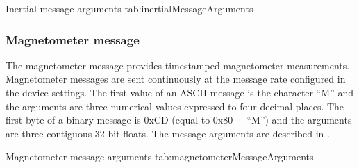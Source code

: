\begingroup
    \def\tempArgumentA{Gyroscope X axis in degrees per second}
    \def\tempArgumentB{Gyroscope Y axis in degrees per second}
    \def\tempArgumentC{Gyroscope Z axis in degrees per second}
    \def\tempArgumentD{Accelerometer X axis in g}
    \def\tempArgumentE{Accelerometer Y axis in g}
    \def\tempArgumentF{Accelerometer Z axis in g}
    \dataMessageTable
    {Inertial message arguments}
    {tab:inertialMessageArguments}
\endgroup

\begingroup
    \def\tempNameA{Gyroscope X axis}
    \def\tempNameB{Gyroscope Y axis}
    \def\tempNameC{Gyroscope Z axis}
    \def\tempNameD{Accelerometer X axis}
    \def\tempNameE{Accelerometer Y axis}
    \def\tempNameF{Accelerometer Z axis}
    \def\tempValueA{0}
    \def\tempValueB{0}
    \def\tempValueC{0}
    \def\tempValueD{0}
    \def\tempValueE{0}
    \def\tempValueF{1}
    \def\tempAsciiFirst{I}
    \def\tempAsciiA{0.0000}
    \def\tempAsciiB{0.0000}
    \def\tempAsciiC{0.0000}
    \def\tempAsciiD{0.0000}
    \def\tempAsciiE{0.0000}
    \def\tempAsciiF{1.0000}
    \def\tempBinaryFirst{C9}
    \def\tempBinaryA{00 00 00 00}
    \def\tempBinaryB{00 00 00 00}
    \def\tempBinaryC{00 00 00 00}
    \def\tempBinaryD{00 00 00 00}
    \def\tempBinaryE{00 00 00 00}
    \def\tempBinaryF{00 00 80 3F}
    \dataMessageExample
\endgroup

\subsubsection{Magnetometer message}

The magnetometer message provides timestamped magnetometer measurements.  Magnetometer messages are sent continuously at the message rate configured in the device settings.  The first value of an \ac{ASCII} message is the character \enquote{M} and the arguments are three numerical values expressed to four decimal places.  The first byte of a binary message is 0xCD (equal to 0x80 + \enquote{M}) and the arguments are three contiguous 32-bit floats.  The message arguments are described in .

\begingroup
    \def\tempArgumentA{Magnetometer X axis in \acs{a.u.}}
    \def\tempArgumentB{Magnetometer Y axis in \acs{a.u.}}
    \def\tempArgumentC{Magnetometer Z axis in \acs{a.u.}}
    \dataMessageTable
    {Magnetometer message arguments}
    {tab:magnetometerMessageArguments}
\endgroup

\begingroup
    \def\tempNameA{Magnetometer X axis}
    \def\tempNameB{Magnetometer Y axis}
    \def\tempNameC{Magnetometer Z axis}
    \def\tempValueA{1}
    \def\tempValueB{0}
    \def\tempValueC{0}
    \def\tempAsciiFirst{M}
    \def\tempAsciiA{1.0000}
    \def\tempAsciiB{0.0000}
    \def\tempAsciiC{0.0000}
    \def\tempBinaryFirst{CD}
    \def\tempBinaryA{00 00 80 3F}
    \def\tempBinaryB{00 00 00 00}
    \def\tempBinaryC{00 00 00 00}
    \dataMessageExample
\endgroup


